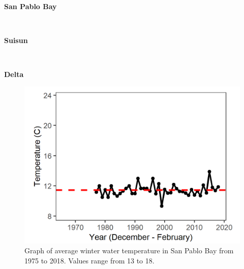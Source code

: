 \documentclass[
]{book}
\begin{document}
\begin{panel-grid}

\begin{columns-nocenter}

\begin{column800}

\textbf{San Pablo Bay}

\end{column800}

\begin{column40}

~

\end{column40}

\begin{column800}

\textbf{Suisun}

\end{column800}

\begin{column40}

~

\end{column40}

\begin{column800}

\textbf{Delta}

\end{column800}

\end{columns-nocenter}

\begin{columns-nocenter}

\begin{column800}

\begin{expand}

\begin{figure}
\includegraphics[width=15.25in]{figures/temp_splwinter} \caption{Graph of average winter water temperature in San Pablo Bay from 1975 to 2018. Values range from 13 to 18.}\label{fig:unnamed-chunk-152}
\end{figure}


\end{expand}
\end{column800}
\end{columns-nocenter}
\end{panel-grid}
\end{document}
